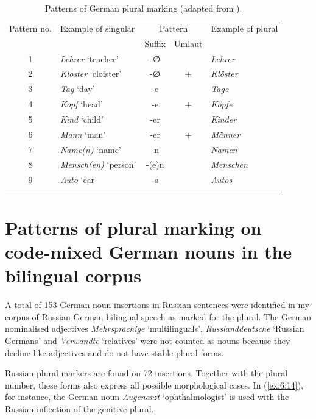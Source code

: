 \begin{table}
\begin{tabular}{c lccl}
 \lsptoprule
	Pattern no. & Example of singular & \multicolumn{2}{c}{Pattern} & Example of plural \\\cmidrule(lr){3-4}
	& & Suffix & Umlaut & \\\midrule
	1 & \textit{Lehrer} `teacher'	& -∅	& \textminus & \textit{Lehrer}\\
	2 & \textit{Kloster} `cloister' & -∅	& + & \textit{Klöster}\\
	3 & \textit{Tag} `day' & -e	& \textminus & \textit{Tage}\\
	4 & \textit{Kopf} `head' & -e	& + & \textit{Köpfe}\\
	5 & \textit{Kind} `child' & -er	& \textminus & \textit{Kinder}\\
	6 & \textit{Mann} `man' & -er	& + & \textit{Männer}\\
	7 & \textit{Name(n)} `name' & -n	& \textminus & \textit{Namen}\\
	8 & \textit{Mensch(en)} `person' & -(e)n	& \textminus & \textit{Menschen}\\
	9 & \textit{Auto} `car' & -s	& \textminus & \textit{Autos}\\
	\lspbottomrule
	\end{tabular}
	\caption{Patterns of German plural marking (adapted from \citealt[480]{flaemig}).\label{tab:6:2}}
\end{table}

\section{Patterns of plural marking on code-mixed German nouns in the bilingual corpus}

A total of 153 German noun insertions in Russian sentences were identified in my corpus of Russian-German bilingual speech as marked for the plural. The German nominalised adjectives \textit{Mehrsprachige} `multilinguals', \textit{Russlanddeutsche} `Russian Germans' and \textit{Verwandte} `relatives' were not counted as nouns because they decline like adjectives and do not have stable plural forms.

Russian plural markers are found on 72 insertions. Together with the plural number, these forms also express all possible morphological cases. In (\ref{ex:6:14}), for instance, the German noun \textit{Augenarzt} `ophthalmologist' is used with the Russian inflection of the genitive plural.

